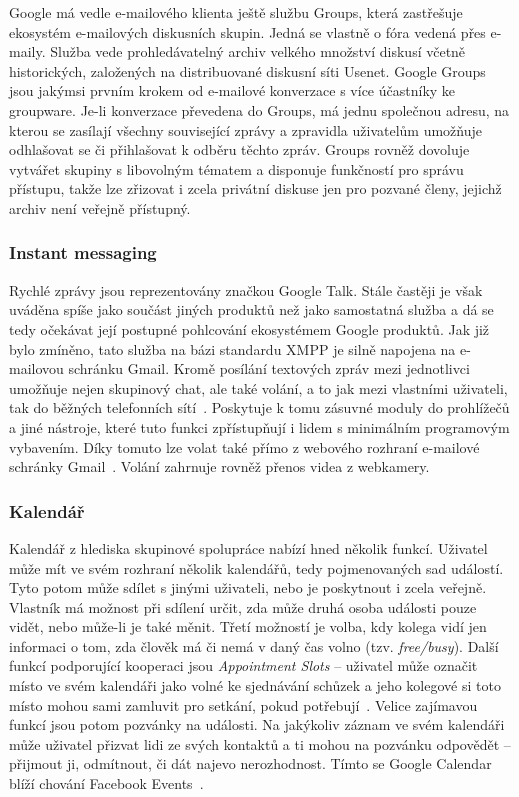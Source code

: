 \documentclass[12pt,oneside,final]{fithesis2}
\begin{document}
Google má vedle e-mailového klienta ještě službu Groups, která zastřešuje ekosystém e-mailových diskusních skupin. Jedná se vlastně o fóra vedená přes e-maily. Služba vede prohledávatelný archiv velkého množství diskusí včetně historických, založených na distribuované diskusní síti Usenet. Google Groups jsou jakýmsi prvním krokem od e-mailové konverzace s více účastníky ke groupware. Je-li konverzace převedena do Groups, má jednu společnou adresu, na kterou se zasílají všechny související zprávy a zpravidla uživatelům umožňuje odhlašovat se či přihlašovat k odběru těchto zpráv. Groups rovněž dovoluje vytvářet skupiny s libovolným tématem a disponuje funkčností pro správu přístupu, takže lze zřizovat i zcela privátní diskuse jen pro pozvané členy, jejichž archiv není veřejně přístupný.

\subsubsection*{Instant messaging}
Rychlé zprávy jsou reprezentovány značkou Google Talk. Stále častěji je však uváděna spíše jako součást jiných produktů než jako samostatná služba a dá se tedy očekávat její postupné pohlcování ekosystémem Google produktů. Jak již bylo zmíněno, tato služba na bázi standardu XMPP je silně napojena na e-mailovou schránku Gmail. Kromě posílání textových zpráv mezi jednotlivci umožňuje nejen skupinový chat, ale také volání, a to jak mezi vlastními uživateli, tak do běžných telefonních sítí~\cite{teague2010making}. Poskytuje k tomu zásuvné moduly do prohlížečů a jiné nástroje, které tuto funkci zpřístupňují i lidem s minimálním programovým vybavením. Díky tomuto lze volat také přímo z webového rozhraní e-mailové schránky Gmail~\cite{schriebman2010call}. Volání zahrnuje rovněž přenos videa z webkamery.

\subsubsection*{Kalendář}
Kalendář z hlediska skupinové spolupráce nabízí hned několik funkcí. Uživatel může mít ve svém rozhraní několik kalendářů, tedy pojmenovaných sad událostí. Tyto potom může sdílet s jinými uživateli, nebo je poskytnout i zcela veřejně. Vlastník má možnost při sdílení určit, zda může druhá osoba události pouze vidět, nebo může-li je také měnit. Třetí možností je volba, kdy kolega vidí jen informaci o tom, zda člověk má či nemá v daný čas volno (tzv. \emph{free/busy}). Další funkcí podporující kooperaci jsou \emph{Appointment Slots} -- uživatel může označit místo ve svém kalendáři jako volné ke sjednávání schůzek a jeho kolegové si toto místo mohou sami zamluvit pro setkání, pokud potřebují~\cite{chung2010introducing}. Velice zajímavou funkcí jsou potom pozvánky na události. Na jakýkoliv záznam ve svém kalendáři může uživatel přizvat lidi ze svých kontaktů a ti mohou na pozvánku odpovědět -- přijmout ji, odmítnout, či dát najevo nerozhodnost. Tímto se Google Calendar blíží chování Facebook Events~\cite{florescu2010insert}.
\end{document}
